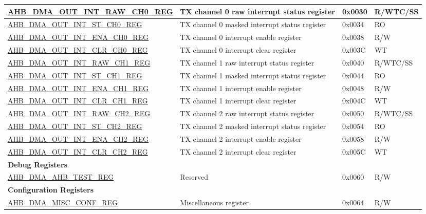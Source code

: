\begin{longtable}{ | l | p{10cm} | p{1.3cm} | l | }
\hyperref[regdesc:AHBDMAOUTINTRAWCHNREG]{AHB\_DMA\_OUT\_INT\_RAW\_CH0\_REG} & TX channel 0 raw interrupt status register & 0x0030 & R/WTC/SS \\ \hline
\hyperref[regdesc:AHBDMAOUTINTSTCHNREG]{AHB\_DMA\_OUT\_INT\_ST\_CH0\_REG} & TX channel 0 masked interrupt status register & 0x0034 & RO \\ \hline
\hyperref[regdesc:AHBDMAOUTINTENACHNREG]{AHB\_DMA\_OUT\_INT\_ENA\_CH0\_REG} & TX channel 0 interrupt enable register & 0x0038 & R/W \\ \hline
\hyperref[regdesc:AHBDMAOUTINTCLRCHNREG]{AHB\_DMA\_OUT\_INT\_CLR\_CH0\_REG} & TX channel 0 interrupt clear register & 0x003C & WT \\ \hline
\hyperref[regdesc:AHBDMAOUTINTRAWCHNREG]{AHB\_DMA\_OUT\_INT\_RAW\_CH1\_REG} & TX channel 1 raw interrupt status register & 0x0040 & R/WTC/SS \\ \hline
\hyperref[regdesc:AHBDMAOUTINTSTCHNREG]{AHB\_DMA\_OUT\_INT\_ST\_CH1\_REG} & TX channel 1 masked interrupt status register & 0x0044 & RO \\ \hline
\hyperref[regdesc:AHBDMAOUTINTENACHNREG]{AHB\_DMA\_OUT\_INT\_ENA\_CH1\_REG} & TX channel 1 interrupt enable register & 0x0048 & R/W \\ \hline
\hyperref[regdesc:AHBDMAOUTINTCLRCHNREG]{AHB\_DMA\_OUT\_INT\_CLR\_CH1\_REG} & TX channel 1 interrupt clear register & 0x004C & WT \\ \hline
\hyperref[regdesc:AHBDMAOUTINTRAWCHNREG]{AHB\_DMA\_OUT\_INT\_RAW\_CH2\_REG} & TX channel 2 raw interrupt status register & 0x0050 & R/WTC/SS \\ \hline
\hyperref[regdesc:AHBDMAOUTINTSTCHNREG]{AHB\_DMA\_OUT\_INT\_ST\_CH2\_REG} & TX channel 2 masked interrupt status register & 0x0054 & RO \\ \hline
\hyperref[regdesc:AHBDMAOUTINTENACHNREG]{AHB\_DMA\_OUT\_INT\_ENA\_CH2\_REG} & TX channel 2 interrupt enable register & 0x0058 & R/W \\ \hline
\hyperref[regdesc:AHBDMAOUTINTCLRCHNREG]{AHB\_DMA\_OUT\_INT\_CLR\_CH2\_REG} & TX channel 2 interrupt clear register & 0x005C & WT \\ \hline
\multicolumn{4}{|l|}{\textbf{Debug Registers}} \\ \hline
\hyperref[regdesc:AHBDMAAHBTESTREG]{AHB\_DMA\_AHB\_TEST\_REG} & Reserved & 0x0060 & R/W \\ \hline
\multicolumn{4}{|l|}{\textbf{Configuration Registers}} \\ \hline
\hyperref[regdesc:AHBDMAMISCCONFREG]{AHB\_DMA\_MISC\_CONF\_REG} & Miscellaneous register & 0x0064 & R/W \\ \hline

\end{longtable}
